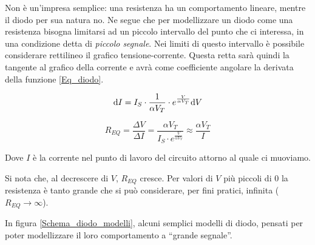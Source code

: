 \documentclass{article}
\begin{document}
Non è un'impresa semplice: una resistenza ha un comportamento lineare, mentre il diodo per sua natura no. Ne segue che per modellizzare un diodo come una resistenza bisogna limitarsi ad un piccolo intervallo del punto che ci interessa, in una condizione detta di \textit{piccolo segnale}. Nei limiti di questo intervallo è possibile considerare rettilineo il grafico tensione-corrente. Questa retta sarà quindi la tangente al grafico della corrente e avrà come coefficiente angolare la derivata della funzione \ref{Eq_diodo}.

\[\textrm d I = I_S \cdot \frac{1}{\alpha V_T} \cdot e^{\frac{V}{\alpha V_T}} \textrm d V\]

\[R_{EQ} = \frac{\Delta V}{\Delta I} = \frac{\alpha V_T}{I_S \cdot e^{\frac{V}{\alpha V_T}}} \approx \frac{\alpha V_T}{I}\]

Dove $I$ è la corrente nel punto di lavoro del circuito attorno al quale ci muoviamo.

\vspace{1mm}

Si nota che, al decrescere di $V$, $R_{EQ}$ cresce. Per valori di $V$ più piccoli di $0$ la resistenza è tanto grande che si può considerare, per fini pratici, infinita ($R_{EQ} \rightarrow \infty$).

\vspace{1mm}

In figura \ref{Schema_diodo_modelli}, alcuni semplici modelli di diodo, pensati per poter modellizzare il loro comportamento a ``grande segnale''.
\end{document}
